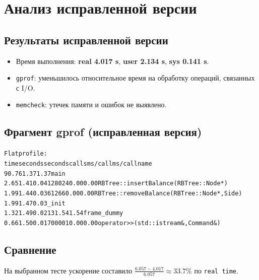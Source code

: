 \section{Анализ исправленной версии}
\subsection{Результаты исправленной версии}
\begin{itemize}
    \item Время выполнения: \textbf{real 4.017 s}, \textbf{user 2.134 s}, \textbf{sys 0.141 s}.
    \item \texttt{gprof}: уменьшилось относительное время на обработку операций, связанных с I/O.
    \item \texttt{memcheck}: утечек памяти и ошибок не выявлено.
\end{itemize}

\subsection{Фрагмент gprof (исправленная версия)}
\begin{alltt}
Flat profile:
 time   seconds   seconds    calls  ms/call  ms/call  name    
 90.76      1.37     1.37                             main
  2.65      1.41     0.04   128024     0.00     0.00  RBTree::insertBalance(RBTree::Node*)
  1.99      1.44     0.03    61266     0.00     0.00  RBTree::removeBalance(RBTree::Node*, Side)
  1.99      1.47     0.03                             _init
  1.32      1.49     0.02       13     1.54     1.54  frame_dummy
  0.66      1.50     0.01   700001     0.00     0.00  operator>>(std::istream&, Command&)
\end{alltt}

\subsection{Сравнение}
На выбранном тесте ускорение составило \(\frac{6.057 - 4.017}{6.057}\approx 33.7\%\) по \texttt{real time}.
\pagebreak

